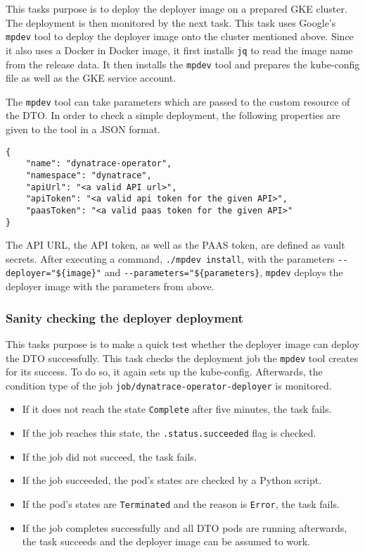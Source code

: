 This tasks purpose is to deploy the deployer image on a prepared GKE cluster.
The deployment is then monitored by the next task.
This task uses Google's \verb|mpdev| tool to deploy the deployer image onto the cluster mentioned above.
Since it also uses a Docker in Docker image, it first installs \verb|jq| to read the image name from the release data.
It then installs the \verb|mpdev| tool and prepares the kube-config file as well as the GKE service account.

The \verb|mpdev| tool can take parameters which are passed to the custom resource of the DTO.
In order to check a simple deployment, the following properties are given to the tool in a JSON format.

\begin{verbatim}
{
    "name": "dynatrace-operator",
    "namespace": "dynatrace",
    "apiUrl": "<a valid API url>",
    "apiToken": "<a valid api token for the given API>",
    "paasToken": "<a valid paas token for the given API>"
}
\end{verbatim}

The API URL, the API token, as well as the PAAS token, are defined as vault secrets.
After executing a command, \verb|./mpdev install|, with the parameters \verb|--deployer="${image}"| and \verb|--parameters="${parameters}|, \verb|mpdev| deploys the deployer image with the parameters from above.

\subsubsection{Sanity checking the deployer deployment}\label{subsubsec:sanity-check-deployer}

This tasks purpose is to make a quick test whether the deployer image can deploy the DTO successfully.
This task checks the deployment job the \verb|mpdev| tool creates for its success.
To do so, it again sets up the kube-config.
Afterwards, the condition type of the job \verb|job/dynatrace-operator-deployer| is monitored.

\begin{itemize}
    \item If it does not reach the state \verb|Complete| after five minutes, the task fails.
    \item If the job reaches this state, the \verb|.status.succeeded| flag is checked.
    \item If the job did not succeed, the task fails.
    \item If the job succeeded, the pod's states are checked by a Python script.
    \item If the pod's states are \verb|Terminated| and the reason is \verb|Error|, the task fails.
    \item If the job completes successfully and all DTO pods are running afterwards, the task succeeds and the deployer image can be assumed to work.
\end{itemize}
